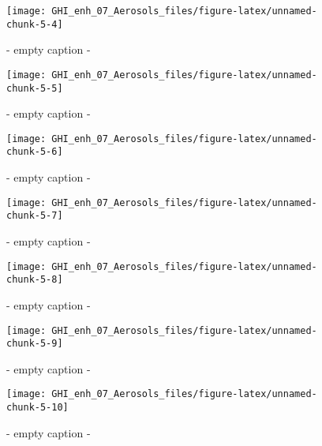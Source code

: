 \documentclass[
  10pt,
  a4paper,oneside]{article}
\begin{document}
\begin{figure}[H]

{\centering \texttt{[image: GHI\_enh\_07\_Aerosols\_files/figure-latex/unnamed-chunk-5-4]} 

}

\caption{ - empty caption - }\label{fig:unnamed-chunk-5-4}
\end{figure}
\begin{figure}[H]

{\centering \texttt{[image: GHI\_enh\_07\_Aerosols\_files/figure-latex/unnamed-chunk-5-5]} 

}

\caption{ - empty caption - }\label{fig:unnamed-chunk-5-5}
\end{figure}
\begin{figure}[H]

{\centering \texttt{[image: GHI\_enh\_07\_Aerosols\_files/figure-latex/unnamed-chunk-5-6]} 

}

\caption{ - empty caption - }\label{fig:unnamed-chunk-5-6}
\end{figure}
\begin{figure}[H]

{\centering \texttt{[image: GHI\_enh\_07\_Aerosols\_files/figure-latex/unnamed-chunk-5-7]} 

}

\caption{ - empty caption - }\label{fig:unnamed-chunk-5-7}
\end{figure}
\begin{figure}[H]

{\centering \texttt{[image: GHI\_enh\_07\_Aerosols\_files/figure-latex/unnamed-chunk-5-8]} 

}

\caption{ - empty caption - }\label{fig:unnamed-chunk-5-8}
\end{figure}
\begin{figure}[H]

{\centering \texttt{[image: GHI\_enh\_07\_Aerosols\_files/figure-latex/unnamed-chunk-5-9]} 

}

\caption{ - empty caption - }\label{fig:unnamed-chunk-5-9}
\end{figure}
\begin{figure}[H]

{\centering \texttt{[image: GHI\_enh\_07\_Aerosols\_files/figure-latex/unnamed-chunk-5-10]} 

}

\caption{ - empty caption - }\label{fig:unnamed-chunk-5-10}
\end{figure}
\end{document}
